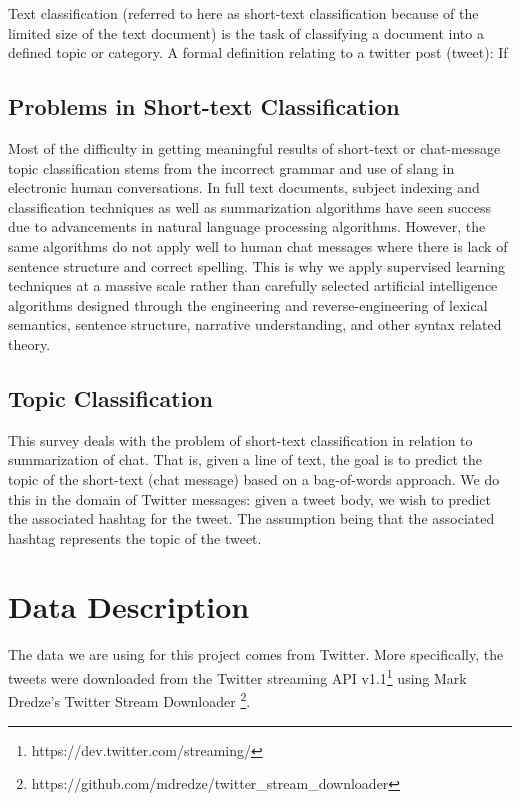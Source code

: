 \documentclass[11pt,letterpaper]{article}
\begin{document}
  Text classification (referred to here as short-text classification because of the limited size of the text document) is the task of classifying a document into a defined topic or category. A formal definition relating to a twitter post (tweet): If 
  
\subsection{Problems in Short-text Classification}
  Most of the difficulty in getting meaningful results of short-text or chat-message topic classification stems from the incorrect grammar and use of slang in electronic human conversations. In full text documents, subject indexing and classification techniques as well as summarization algorithms have seen success due to advancements in natural language processing algorithms. However, the same algorithms do not apply well to human chat messages where there is lack of sentence structure and correct spelling.
  This is why we apply supervised learning techniques at a massive scale rather than carefully selected artificial intelligence algorithms designed through the engineering and reverse-engineering of lexical semantics, sentence structure, narrative understanding, and other syntax related theory.

\subsection{Topic Classification}
  This survey deals with the problem of short-text classification in relation to summarization of chat. That is, given a line of text, the goal is to predict the topic of the short-text (chat message) based on a bag-of-words approach. We do this in the domain of Twitter messages: given a tweet body, we wish to predict the associated hashtag for the tweet. The assumption being that the associated hashtag represents the topic of the tweet.
  


\section{Data Description}
The data we are using for this project comes from Twitter. More specifically, the tweets were downloaded from the Twitter streaming API v1.1\footnote{https://dev.twitter.com/streaming/} using Mark Dredze's Twitter Stream Downloader \footnote{https://github.com/mdredze/twitter\_stream\_downloader}.
 
\end{document}

